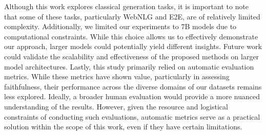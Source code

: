 Although this work explores classical generation tasks, it is important to note that some of these tasks, particularly WebNLG and E2E, are of relatively limited complexity.
Additionally, we limited our experiments to 7B models due to computational constraints. While this choice allows us to effectively demonstrate our approach, larger models could potentially yield different insights. Future work could validate the scalability and effectiveness of the proposed methods on larger model architectures.
Lastly, this study primarily relied on automatic evaluation metrics. While these metrics have shown value, particularly in assessing faithfulness, their performance across the diverse domains of our datasets remains less explored. Ideally, a broader human evaluation would provide a more nuanced understanding of the results. However, given the resource and logistical constraints of conducting such evaluations, automatic metrics serve as a practical solution within the scope of this work, even if they have certain limitations.
